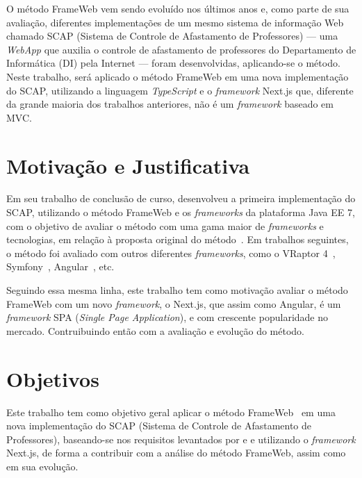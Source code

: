 O método FrameWeb vem sendo evoluído nos últimos anos e, como parte de sua avaliação, diferentes implementações de um mesmo 
sistema de informação Web chamado SCAP (Sistema de Controle de Afastamento de Professores) --- uma \textit{WebApp} que auxilia o 
controle de afastamento de professores do Departamento de Informática (DI) pela Internet --- foram desenvolvidas, aplicando-se o método. 
Neste trabalho, será aplicado o método FrameWeb em uma nova implementação do SCAP, utilizando
a linguagem \textit{TypeScript} e o \textit{framework} Next.js que, diferente da grande maioria dos trabalhos anteriores, 
não é um \textit{framework} baseado em MVC.



\section{Motivação e Justificativa}
\label{sec-intro-motjus}

Em seu trabalho de conclusão de curso,  desenvolveu a primeira implementação do SCAP, utilizando o método FrameWeb e os
\textit{frameworks} da plataforma Java EE 7, com o objetivo de avaliar o método com uma gama maior de \textit{frameworks} e tecnologias,
em relação à proposta original do método~\cite{souza:2007}. Em trabalhos seguintes, o método foi
avaliado com outros diferentes \textit{frameworks}, como o VRaptor 4~\cite{prado:2015}, 
Symfony~\cite{berger:2019}, Angular~\cite{gomes:2022}, etc.

Seguindo essa mesma linha, este trabalho tem como motivação avaliar o método FrameWeb com um novo \textit{framework},
o Next.js, que assim como Angular, é um \textit{framework} SPA (\textit{Single Page Application}), e com crescente popularidade 
no mercado. Contruibuindo então com a avaliação e evolução do método.



\section{Objetivos}
\label{sec-intro-obj}

Este trabalho tem como objetivo geral aplicar o método FrameWeb~\cite{souza:2007} em uma nova implementação do SCAP (Sistema de Controle de Afastamento de Professores),
baseando-se nos requisitos levantados por  e  e utilizando o \textit{framework} Next.js, de forma a contribuir com a análise do método FrameWeb, assim como em sua evolução.

